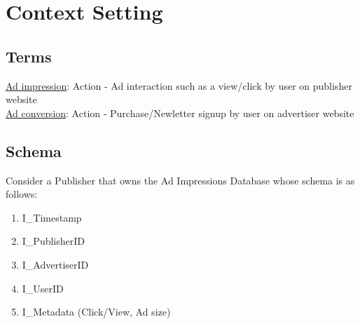 
\clearpage
{}

%
\setcounter{section}{0} %

\section{Context Setting}
\subsection{Terms}
\underline{Ad impression}: Action - Ad interaction such as a view/click by user on publisher website \\

\underline{Ad conversion}: Action - Purchase/Newletter signup by user on advertiser website \\

\subsection{Schema}
Consider a Publisher that owns the Ad Impressions Database whose schema is as follows:
\begin{enumerate}
    \item I\_Timestamp
    \item I\_PublisherID
    \item I\_AdvertiserID
    \item I\_UserID
    \item I\_Metadata (Click/View, Ad size)
\end{enumerate}


